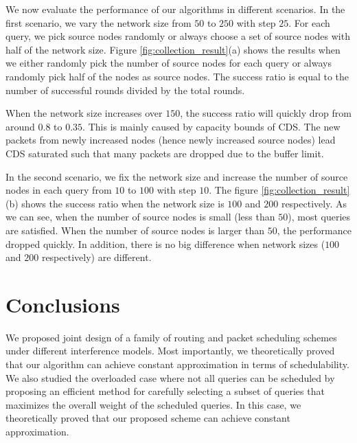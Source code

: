 \documentclass[conference,10pt]{IEEEtran}\usepackage{amsmath}
\begin{document}
We now evaluate the performance of our algorithms in different
scenarios. In the first scenario,
 we vary the network size from $50$ to $250$ with step $25$.
For each query, we pick source nodes randomly or always choose a set
of
 source nodes with half of the network size.
Figure \ref{fig:collection_result}(a) shows the results when we
either randomly pick the number
 of source nodes for each query or always randomly pick half of the nodes as
 source nodes.
The success ratio is equal to the number of successful rounds
divided by the total rounds.

When the network size increases over $150$, the success ratio will
quickly
 drop from around $0.8$ to $0.35$.
This is mainly caused by capacity bounds of CDS. The new packets
from newly increased nodes (hence newly increased source nodes) lead
CDS
 saturated such that many packets are dropped due to the buffer limit.


In the second scenario, we fix the network size and increase the
number of source nodes
 in each query from $10$ to $100$ with step $10$.
The figure \ref{fig:collection_result} (b) shows the success ratio
when the network size is
 $100$ and $200$ respectively.
As we can see, when the number of source nodes is small (less than
$50$),
 most queries are satisfied.
When the number of source nodes is larger than $50$, the performance
dropped quickly. In addition, there is no big difference when
network sizes ($100$ and $200$ respectively) are
 different.


\section{Conclusions}
\label{sec:conclusion}

We proposed joint design of a family of routing and packet
scheduling schemes under different interference models. Most
importantly, we theoretically proved that our algorithm can achieve
constant approximation in terms of schedulability. We also studied
the overloaded case where not all queries can be scheduled by
proposing an efficient method for carefully selecting a subset of
queries that maximizes the overall weight of the scheduled queries.
In this case, we theoretically proved that our proposed scheme
 can achieve constant approximation.
\end{document}
